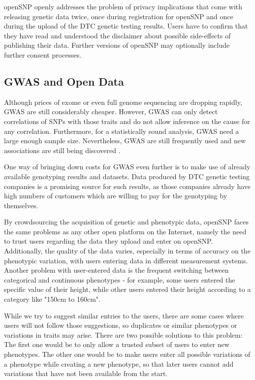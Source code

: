 \documentclass[10pt]{article}
\begin{document}
openSNP openly addresses the problem of privacy implications that come with releasing genetic data twice, once during registration for openSNP and once during 
the upload of the DTC genetic testing results. Users have to confirm that they have read and understood the disclaimer about possible side-effects 
of publishing their data. Further versions of openSNP may optionally include further consent processes.


\subsection*{GWAS and Open Data}
Although prices of exome or even full genome sequencing are dropping rapidly, GWAS are still considerably cheaper. However, GWAS can only detect correlations of SNPs with those traits and do not allow 
inference on the cause for any correlation. Furthermore, for a statistically sound analysis, GWAS need a large enough sample size. Nevertheless, GWAS are still frequently used and new associations are still being discovered \cite{10.1371.journal.pone.0031470,10.1371.journal.pone.0030309,10.1371.journal.pone.0029848}. 

One way of bringing down costs for GWAS even further is to make use of already available genotyping results and datasets. 
Data produced by DTC genetic testing companies is a promising source for such results, as those companies already have high 
numbers of customers which are willing to pay for the genotyping by themselves.

By crowdsourcing the acquisition of genetic and phenotypic data, openSNP faces the same problems as any other 
open platform on the Internet, namely the need to trust users regarding the data they upload and enter on openSNP. 
Additionally, the quality of the data varies, especially in terms of accuracy on the phenotypic variation, 
with users entering data in different measurement systems. Another problem with user-entered data is the frequent switching between categorical and continuous phenotypes - for example, some users entered the specific value of their height, while other users entered their height according to a category like "150cm to 160cm". 

While we try to suggest similar entries to the users, 
there are some cases where users will not follow those suggestions, so duplicates or similar phenotypes or variations in traits may arise. There are two possible solutions to this problem: The first one would be to only allow a trusted subset of users to enter new phenotypes. The other one 
would be to make users enter all possible variations of a phenotype while creating a new phenotype, so that later users cannot add 
variations that have not been available from the start. 
\end{document}
